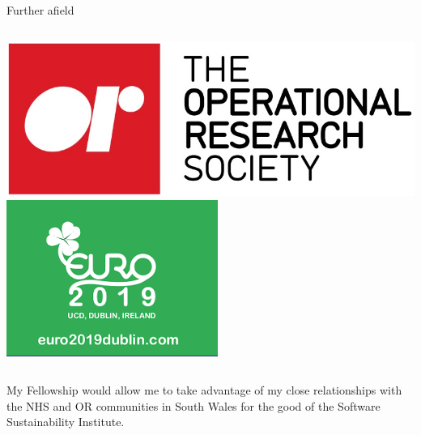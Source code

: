 \documentclass{beamer}
\begin{document}
\begin{frame}{Further afield}
\begin{columns}[T]
\begin{column}{.75\textwidth}
            \centering
            \includegraphics[width=.8\linewidth]{theorsociety.jpg}\\
            \vspace{10pt}
            \includegraphics[width=.4\linewidth]{dublin.png}\hspace{20pt}%
        \end{column}
    \end{columns}


\end{frame}


\begin{frame}

    \huge{%
        My Fellowship would allow me to take advantage of my close relationships
        with the NHS and OR communities in South Wales for the good of the 
        Software Sustainability Institute.
    }

\end{frame}
\end{document}
